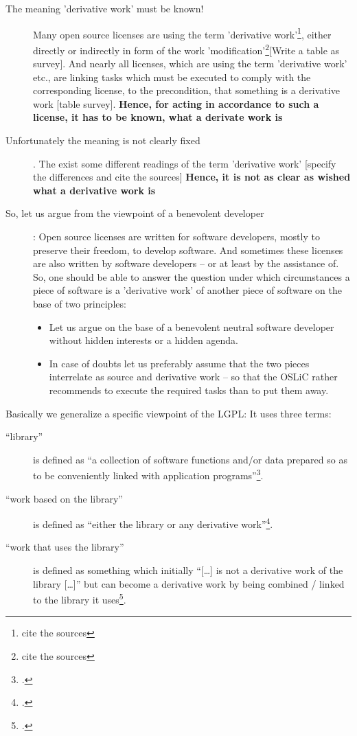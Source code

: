 \begin{description}
  \item[The meaning 'derivative work' must be known!] Many open source licenses
  are using the term 'derivative work'\footnote{cite the sources}, either
  directly or indirectly in form of the work 'modification'\footnote{cite the
  sources}[Write a table as survey]. And nearly all licenses, which are using
  the term 'derivative work' etc., are linking tasks which must be executed to
  comply with the corresponding license, to the precondition, that something is
  a derivative work [table survey]. \textbf{Hence, for acting in accordance to
  such a license, it has to be known, what a derivate work is}
  \item[Unfortunately the meaning is not clearly fixed]. The exist some
  different readings of the term 'derivative work' [specify the differences and
  cite the sources] \textbf{Hence, it is not as clear as wished what a derivative
  work is}
  \item[So, let us argue from the viewpoint of a benevolent developer]: Open
  source licenses are written for software developers, mostly to preserve their
  freedom, to develop software. And sometimes these licenses are also written by
  software developers -- or at least by the assistance of. So, one should be
  able to answer the question under which circumstances a piece of software is a
  'derivative work' of another piece of software on the base of two principles:
  \begin{itemize}
  \item Let us argue on the base of a benevolent neutral software developer
  without hidden interests or a hidden agenda.
  \item In case of doubts let us preferably assume that the two pieces
  interrelate as source and derivative work -- so that the OSLiC rather recommends
  to execute the required tasks than to put them away.
\end{itemize}
\end{description}

Basically we generalize a specific viewpoint of the LGPL: It uses three terms:

\begin{description}
  \item[\enquote{library}] is defined as \enquote{a collection of software
  functions and/or data prepared so as to be conveniently linked with
  application programs}\footcite[cf.][\nopage wp §0]{Lgpl21OsiLicense1999a}.
  \item[\enquote{work based on the library}] is defined as \enquote{either the
  library or any derivative work}\footcite[cf.][\nopage wp
  §0]{Lgpl21OsiLicense1999a}.
  \item[\enquote{work that uses the library}] is defined as something which
  initially \enquote{[\ldots] is not a derivative work of the library [\ldots]}
  but can become a derivative work by being combined / linked to the library it
  uses\footcite[cf.][\nopage wp §5]{Lgpl21OsiLicense1999a}.
\end{description}

